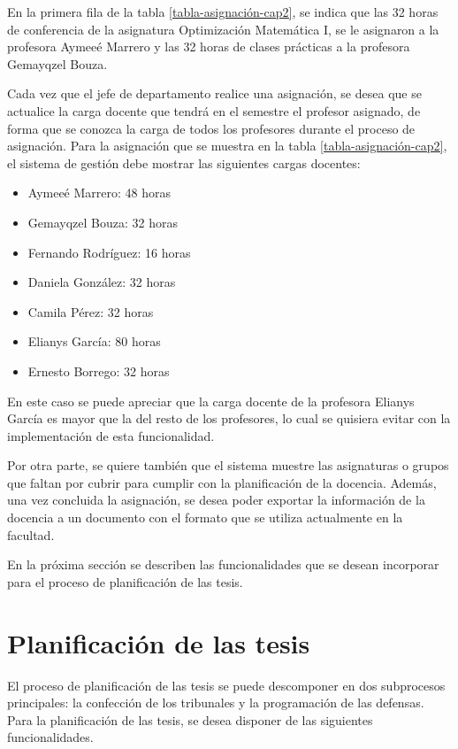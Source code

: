 En la primera fila de la tabla \ref{tabla-asignación-cap2}, se indica 
que las 32 horas de conferencia de la asignatura Optimización Matemática I,
se le asignaron a la profesora Aymeeé Marrero y las 32 horas de clases prácticas a la profesora Gemayqzel Bouza.

Cada vez que el jefe de departamento realice una 
asignación, se desea que se actualice la carga docente que tendrá en el semestre el profesor asignado, de forma que se conozca la carga 
de todos los profesores durante el proceso de asignación.
Para la asignación que se muestra en la tabla \ref{tabla-asignación-cap2}, 
el sistema de gestión debe mostrar las siguientes cargas docentes:

\begin{multicols}{2}
    \begin{itemize}
        \item Aymeeé Marrero: 48 horas
        \item Gemayqzel Bouza: 32 horas 
        \item Fernando Rodríguez: 16 horas 
        \item Daniela González: 32 horas 
        \item Camila Pérez: 32 horas
        \item Elianys García: 80 horas
        \item Ernesto Borrego: 32 horas 
    \end{itemize}
\end{multicols}

En este caso se puede apreciar que la carga docente de la profesora 
Elianys García es mayor que la del resto de los profesores, lo cual se 
quisiera evitar con la implementación de esta funcionalidad. 


Por otra parte, se quiere también que el sistema muestre las asignaturas o 
grupos que faltan por cubrir para cumplir con la planificación de la docencia. 
Además, una vez concluida la asignación, se desea poder exportar la información de la docencia a un documento con el 
formato que se utiliza actualmente en la facultad. 


En la próxima sección se describen las funcionalidades que se desean incorporar para el 
proceso de planificación de las tesis.


\section{Planificación de las tesis}\label{tesis:cap2}
El proceso de planificación de las tesis se puede descomponer en dos subprocesos principales: 
la confección de los tribunales y la programación de las defensas.
Para la planificación de las tesis, se desea disponer de las siguientes funcionalidades.



